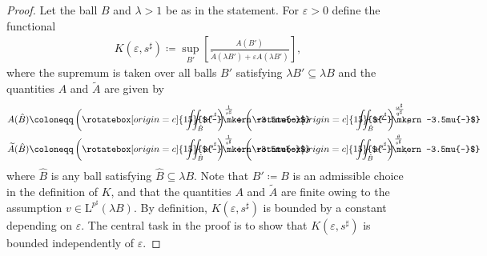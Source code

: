 \documentclass[11pt, leqno]{amsart}
\theoremstyle{definition}
\renewcommand{\L}{\mathrm{L}}
\newcommand{\eps}{\varepsilon}
\newcommand{\wt}{\widetilde}
\def\Yint#1{\mathchoice
	{\YYint\displaystyle\textstyle{#1}}%
	{\YYint\textstyle\scriptstyle{#1}}%
	{\YYint\scriptstyle\scriptscriptstyle{#1}}%
	{\YYint\scriptscriptstyle\scriptscriptstyle{#1}}%
	\!\iint}
\def\YYint#1#2#3{{\setbox0=\hbox{$#1{#2#3}{\iint}$}
		\vcenter{\hbox{$#2#3$}}\kern-.51\wd0}}
\def\longdash{{-}\mkern-3.5mu{-}}
\def\tiltlongdash{\rotatebox[origin=c]{15}{$\longdash$}}
\def\tiltfiint{\Yint\longdash}
\def\tiltfiint{\Yint\tiltlongdash}
\begin{document}
	\begin{proof}
		Let the ball $B$ and $\lambda > 1$ be as in the statement.
		For $\eps > 0$ define the functional
		\begin{align}
			K(\eps, s^\sharp) \coloneqq \sup_{B'} \left[ \frac{A(B')}{\wt A(\lambda B') + \eps A(\lambda B')}\right],
		\end{align}
		where the supremum is taken over all balls $B'$ satisfying $\lambda B' \subseteq \lambda B$
		and the quantities $A$ and $\tilde A$ are given by
		\begin{align}
			A(\hat B) &\coloneqq \left( \tiltfiint_{\hat B} v^{r^\sharp} \right)^\frac{1}{r^\sharp} + \left( \tiltfiint_{\hat B} v^{q^\sharp} \right)^\frac{\alpha^\sharp}{q^\sharp}, \\
			\wt A(\hat B) &\coloneqq \left( \tiltfiint_{\hat B} v^{s^\sharp} \right)^\frac{1}{s^\sharp} + \left( \tiltfiint_{\hat B} v^{s^\sharp} \right)^\frac{\theta}{s^\sharp},
		\end{align}
		{where $\hat B$ is any ball satisfying $\hat B \subseteq \lambda B$. Note that $B' \coloneqq B$ is an admissible choice in the definition of $K$, and that the quantities $A$ and $\tilde A$ are finite owing to the assumption $v\in \L^{p^\sharp}(\lambda B)$.}
		By definition, $K(\eps, s^\sharp)$ is bounded by a constant depending on $\eps$. The central task in the proof is to show that $K(\eps, s^\sharp)$ is bounded independently of $\eps$.


\end{proof}
\end{document}
